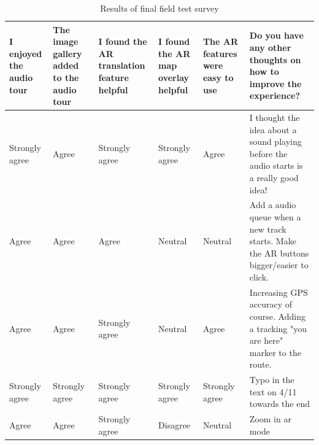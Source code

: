 \documentclass[a4paper, 10pt, american, titlepage]{article}
\begin{document}

\begin{table}[h]
\begin{singlespace}
\begin{tabulary}{\textwidth}{ L | L | L | L | L | L }
	I enjoyed the audio tour & The image gallery added to the audio tour & I
	found the AR translation feature helpful & I found the AR map overlay
	helpful & The AR features were easy to use & Do you have any other thoughts
	on how to improve the experience? \\
	\hline

	Strongly agree & Agree & Strongly agree & Strongly agree & Agree & I thought
	the idea about a sound playing before the audio starts is a really good
	idea! \\

	Agree & Agree & Agree & Neutral & Neutral & Add a audio queue when a new
	track starts. Make the AR buttons bigger/easier to click. \\

	Agree & Agree & Strongly agree & Neutral & Agree & Increasing GPS accuracy
	of course. Adding a tracking "you are here" marker to the route. \\

	Strongly agree & Strongly agree & Strongly agree & Strongly agree & Strongly
	agree & Typo in the text on 4/11 towards the end \\

	Agree & Agree & Strongly agree & Disagree & Neutral & Zoom in ar mode \\
\end{tabulary}
\end{singlespace}
\caption{Results of final field test survey}
\label{tab:testingSurveyResults}
\end{table}
\end{document}
